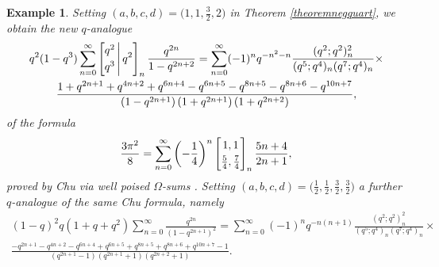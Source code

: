 \documentclass[12pt]{article}
\newtheorem{example}{Example}
\begin{document}
\begin{example}
 Setting $(a, b, c, d) = \big( 1, 1, \frac{3}{2}, 2 \big)$ in Theorem \ref{theoremnegquart}, we obtain the new $q$-analogue
\begin{multline*}
 q^2 (1-q^3) 
 \sum_{n=0}^{\infty} 
 \left[ \begin{matrix} 
 q^2 \vspace{1mm} \\ 
 q^3 \end{matrix} \, \Bigg| \, q^2 \right]_{n} 
 \frac{q^{2n}}{1 - q^{2n+2}} = \sum_{n=0}^{\infty} (-1)^{n} 
 q^{-n^2-n} 
 \frac{(q^2;q^2)_{n}^{2}}{(q^5;q^4)_{n}(q^7;q^4)_{n} } \times \\ 
 \frac{1 + q^{2 n+1}+q^{4 n+2}+q^{6 n+4}-q^{6 n+5}-q^{8 n+5}-q^{8 n+6}-q^{10 n + 
 7} }{\left(1-q^{2 n+1}\right) \left(1 + q^{2 n+1}\right) \left(1 + q^{2
 n+2}\right)}, 
\end{multline*}
 of the formula 
\begin{equation}\label{20q25q1qq12q9wrwrrwwr4r1e1e1e0e3wAwqM1qA}
 \frac{3\pi^2}{8} = 
 \sum_{n = 0}^{\infty} 
 \left( -\frac{1}{4} \right)^{n} \left[ \begin{matrix} 
 1, 1 
 \vspace{1mm} \\ 
 \frac{5}{4}, \frac{7}{4} 
 \end{matrix} \right]_{n} \frac{5n+4}{2n+1}, 
 \end{equation}
 proved by Chu via well poised $\Omega$-sums \cite[Example 32]{Chu2021Omega}. 
 Setting $(a, b, c, d) = \big( \frac{1}{2}, \frac{1}{2}, \frac{3}{2}, \frac{3}{2} \big)$ a further 
 $q$-analogue of the same Chu formula, namely 
\begin{multline*}
 (1-q)^2 q (1+q+q^2) 
 \sum_{n=0}^{\infty} 
 \frac{q^{2n}}{(1-q^{2n+1})^{2} } = 
 \sum_{n=0}^{\infty} (-1)^{n} 
 q^{-n(n+1)} 
 \frac{ \left( q^2; q^2 \right)_{n}^{2} }{ \left( q^{5};q^{4} \right)_{n} 
 \left( q^{7};q^{4} \right)_{n} } \times \\ 
 \frac{-q^{2 n+1}-q^{4 n+2}-q^{6 n+4}+q^{6 n+5}+q^{8 n+5}+q^{8 n+6}+q^{10 n+7}-1}{\left(q^{2 n+1}-1\right) \left(q^{2 n+1}+1\right) \left(q^{2
 n+2}+1\right)}. 
\end{multline*}
\end{example}
 
\end{document}
